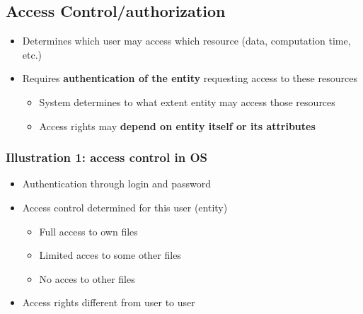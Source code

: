 \documentclass[11pt,british,faculty=ea,layout=titlefont,underline=false,titleUppercase=true,titleUnderline=true,hidelinks]{ugent2016-report}
\begin{document}

        \subsection{Access Control/authorization} \label{sub:access-control-authorization}
            \begin{itemize}
                \item Determines which user may access which resource (data, computation time, etc.)
                \item Requires \textbf{authentication of the entity} requesting access to these resources
                \begin{itemize}
                    \item System determines to what extent entity may access those resources
                    \item Access rights may \textbf{depend on entity itself or its attributes}
                \end{itemize}
            \end{itemize}

            \subsubsection{Illustration 1: access control in OS} \label{subsub:access-control-in-os}
                \begin{itemize}
                    \item Authentication through login and password
                    \item Access control determined for this user (entity)
                        \begin{itemize}
                            \item Full access to own files
                            \item Limited acces to some other files
                            \item No acces to other files
                        \end{itemize}
                    \item Access rights different from user to user
                \end{itemize}
            
\end{document}
